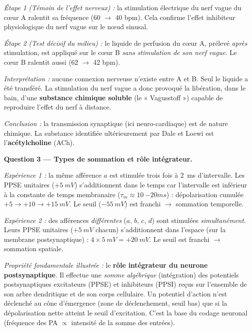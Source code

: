 \documentclass[11pt]{article}
\newcommand{\cle}[1]{{\popxbold\color{popdark}#1}}
\begin{document}
\begin{exoresolu}
\emph{Étape 1 (Témoin de l'effet nerveux) :} la stimulation électrique du nerf vague du cœur A ralentit sa fréquence (60 $\to$ 40 bpm). Cela confirme l'effet inhibiteur physiologique du nerf vague sur le nœud sinusal.

\emph{Étape 2 (Test décisif du milieu) :} le liquide de perfusion du cœur A, prélevé \emph{après} stimulation, est appliqué sur le cœur B \emph{sans stimulation de son nerf vague}. Le cœur B ralentit aussi (62 $\to$ 42 bpm).

\emph{Interprétation :} aucune connexion nerveuse n'existe entre A et B. Seul le liquide a été transféré. La stimulation du nerf vague a donc provoqué la libération, dans le bain, d'une \textbf{substance chimique soluble} (le « Vagusstoff ») capable de reproduire l'effet du nerf à distance.

\emph{Conclusion :} la transmission synaptique (ici neuro-cardiaque) est de nature \cle{chimique}. La substance identifiée ultérieurement par Dale et Loewi est l'\textbf{acétylcholine} (ACh).

\medskip

\textbf{Question 3 — Types de sommation et rôle intégrateur.}

\emph{Expérience 1 :} la même afférence $a$ est stimulée trois fois à \SI{2}{ms} d'intervalle. Les PPSE unitaires ($+\SI{5}{mV}$) s'additionnent dans le temps car l'intervalle est inférieur à la constante de temps membranaire ($\tau_m \approx \SI{10}{-20}{ms}$) : dépolarisation cumulée $+5 \to +10 \to +\SI{15}{mV}$. Le seuil ($\SI{-55}{mV}$) est franchi $\to$ \cle{sommation temporelle}.

\emph{Expérience 2 :} des afférences \emph{différentes} ($a$, $b$, $c$, $d$) sont stimulées \emph{simultanément}. Leurs PPSE unitaires ($+\SI{5}{mV}$ chacun) s'additionnent dans l'espace (sur la membrane postsynaptique) : $4 \times \SI{5}{mV} = +\SI{20}{mV}$. Le seuil est franchi $\to$ \cle{sommation spatiale}.

\emph{Propriété fondamentale illustrée :} le \textbf{rôle intégrateur du neurone postsynaptique}. Il effectue une \emph{somme algébrique} (intégration) des potentiels postsynaptiques excitateurs (PPSE) et inhibiteurs (PPSI) reçus sur l'ensemble de son arbre dendritique et de son corps cellulaire. Un potentiel d'action n'est déclenché au cône d'émergence (zone de déclenchement, seuil bas) que si la dépolarisation nette atteint le seuil d'excitation. C'est la base du codage neuronal (fréquence des PA $\propto$ intensité de la somme des entrées).


\end{exoresolu}
\end{document}
